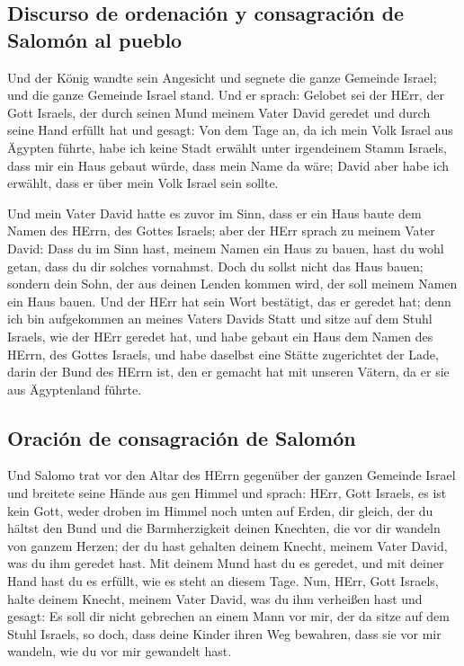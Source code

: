 \hypertarget{discurso-de-ordenaciuxf3n-y-consagraciuxf3n-de-salomuxf3n-al-pueblo}{%
\subsection{Discurso de ordenación y consagración de Salomón al
pueblo}\label{discurso-de-ordenaciuxf3n-y-consagraciuxf3n-de-salomuxf3n-al-pueblo}}

 Und der König wandte sein Angesicht und segnete die
ganze Gemeinde Israel; und die ganze Gemeinde Israel stand.
 Und er sprach: Gelobet sei der HErr, der Gott Israels,
der durch seinen Mund meinem Vater David geredet und durch seine Hand
erfüllt hat und gesagt:  Von dem Tage an, da ich mein
Volk Israel aus Ägypten führte, habe ich keine Stadt erwählt unter
irgendeinem Stamm Israels, dass mir ein Haus gebaut würde, dass mein
Name da wäre; David aber habe ich erwählt, dass er über mein Volk Israel
sein sollte.

 Und mein Vater David hatte es zuvor im Sinn, dass er ein
Haus baute dem Namen des HErrn, des Gottes Israels;  aber
der HErr sprach zu meinem Vater David: Dass du im Sinn hast, meinem
Namen ein Haus zu bauen, hast du wohl getan, dass du dir solches
vornahmst.  Doch du sollst nicht das Haus bauen; sondern
dein Sohn, der aus deinen Lenden kommen wird, der soll meinem Namen ein
Haus bauen.  Und der HErr hat sein Wort bestätigt, das er
geredet hat; denn ich bin aufgekommen an meines Vaters Davids Statt und
sitze auf dem Stuhl Israels, wie der HErr geredet hat, und habe gebaut
ein Haus dem Namen des HErrn, des Gottes Israels,  und
habe daselbst eine Stätte zugerichtet der Lade, darin der Bund des HErrn
ist, den er gemacht hat mit unseren Vätern, da er sie aus Ägyptenland
führte.

\hypertarget{oraciuxf3n-de-consagraciuxf3n-de-salomuxf3n}{%
\subsection{Oración de consagración de
Salomón}\label{oraciuxf3n-de-consagraciuxf3n-de-salomuxf3n}}

 Und Salomo trat vor den Altar des HErrn gegenüber der
ganzen Gemeinde Israel und breitete seine Hände aus gen Himmel
 und sprach: HErr, Gott Israels, es ist kein Gott, weder
droben im Himmel noch unten auf Erden, dir gleich, der du hältst den
Bund und die Barmherzigkeit deinen Knechten, die vor dir wandeln von
ganzem Herzen;  der du hast gehalten deinem Knecht,
meinem Vater David, was du ihm geredet hast. Mit deinem Mund hast du es
geredet, und mit deiner Hand hast du es erfüllt, wie es steht an diesem
Tage.  Nun, HErr, Gott Israels, halte deinem Knecht,
meinem Vater David, was du ihm verheißen hast und gesagt: Es soll dir
nicht gebrechen an einem Mann vor mir, der da sitze auf dem Stuhl
Israels, so doch, dass deine Kinder ihren Weg bewahren, dass sie vor mir
wandeln, wie du vor mir gewandelt hast.

